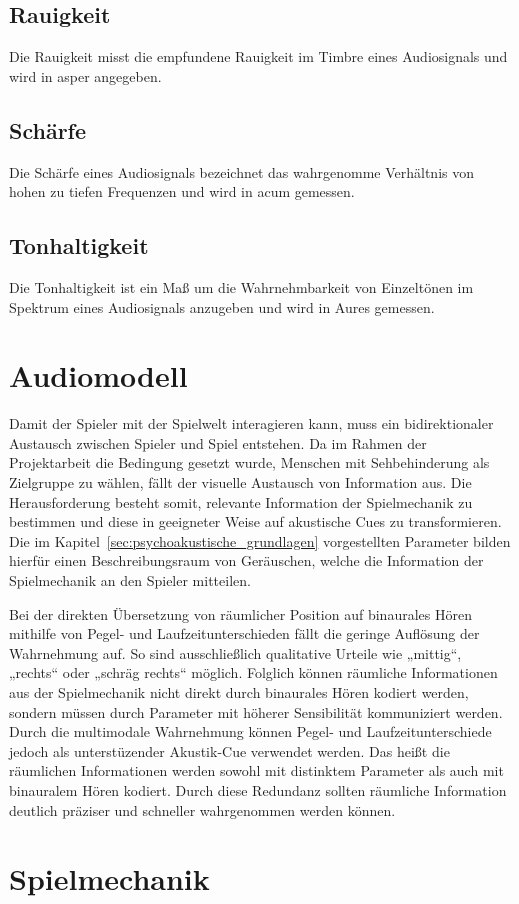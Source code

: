 \documentclass[a4paper, 11pt]{scrartcl}
\begin{document}
\subsection{Rauigkeit}
\label{sub:rauigkeit}

Die Rauigkeit misst die empfundene Rauigkeit im Timbre eines Audiosignals und
wird in asper angegeben.

\subsection{Schärfe}
\label{sub:schaerfe}

Die Schärfe eines Audiosignals bezeichnet das wahrgenomme Verhältnis von hohen
zu tiefen Frequenzen und wird in acum gemessen.

\subsection{Tonhaltigkeit}
\label{sub:tonhaltigkeit}

Die Tonhaltigkeit ist ein Maß um die Wahrnehmbarkeit von Einzeltönen im Spektrum
eines Audiosignals anzugeben und wird in Aures gemessen.

\section{Audiomodell}
\label{sec:audiomodell}

Damit der Spieler mit der Spielwelt interagieren kann, muss ein bidirektionaler
Austausch zwischen Spieler und Spiel entstehen. Da im Rahmen der Projektarbeit
die Bedingung gesetzt wurde, Menschen mit Sehbehinderung als Zielgruppe zu
wählen, fällt der visuelle Austausch von Information aus. Die Herausforderung
besteht somit, relevante Information der Spielmechanik zu bestimmen und diese in
geeigneter Weise auf akustische Cues zu transformieren. Die im
Kapitel~\ref{sec:psychoakustische_grundlagen} vorgestellten Parameter bilden
hierfür einen Beschreibungsraum von Geräuschen, welche die Information der
Spielmechanik an den Spieler mitteilen.

Bei der direkten Übersetzung von räumlicher Position auf binaurales Hören
mithilfe von Pegel- und Laufzeitunterschieden fällt die geringe Auflösung der
Wahrnehmung auf. So sind ausschließlich qualitative Urteile wie „mittig“,
„rechts“ oder „schräg rechts“ möglich. Folglich können räumliche Informationen
aus der Spielmechanik nicht direkt durch binaurales Hören kodiert werden,
sondern müssen durch Parameter mit höherer Sensibilität kommuniziert werden.
Durch die multimodale Wahrnehmung können Pegel- und Laufzeitunterschiede jedoch
als unterstüzender Akustik-Cue verwendet werden. Das heißt die räumlichen
Informationen werden sowohl mit distinktem Parameter als auch mit binauralem
Hören kodiert. Durch diese Redundanz sollten räumliche Information deutlich
präziser und schneller wahrgenommen werden können.

\section{Spielmechanik}
\label{sec:spielmechanik}
\end{document}
